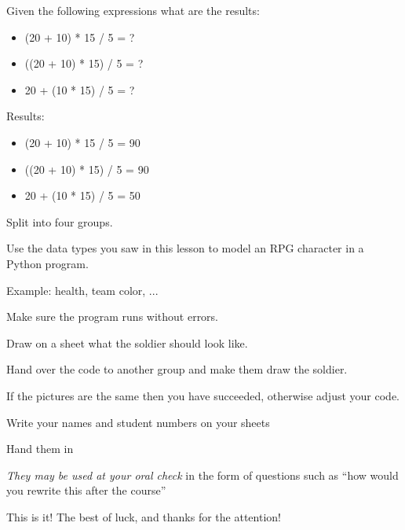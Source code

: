 \documentclass{beamer}
\begin{document}
\begin{slide}{
\item Given the following expressions what are the results:
\begin{itemize}
\item (20 + 10) * 15 / 5 = ?
\item ((20 + 10) * 15) / 5 = ?
\item 20 + (10 * 15) / 5 = ?
\end{itemize}
\pause 
\item Results: 
\begin{itemize}
\item (20 + 10) * 15 / 5 = 90
\item ((20 + 10) * 15) / 5 = 90
\item 20 + (10 * 15) / 5 = 50
\end{itemize}
}\end{slide}


\begin{slide}{
\item Split into four groups.
\item Use the data types you saw in this lesson to model an RPG character in a Python program.
\item Example: health, team color, ...
\item Make sure the program runs without errors.
\item Draw on a sheet what the soldier should look like.
\item Hand over the code to another group and make them draw the soldier.
\item If the pictures are the same then you have succeeded, otherwise adjust your code.
}\end{slide}


\begin{slide}{
\item Write your names and student numbers on your sheets
\item Hand them in
\item \textit{They may be used at your oral check} in the form of questions such as ``how would you rewrite this after the course''
}\end{slide}


\begin{frame}{This is it!}
\center
\fontsize{18pt}{7.2}\selectfont
The best of luck, and thanks for the attention!
\end{frame}
\end{document}
